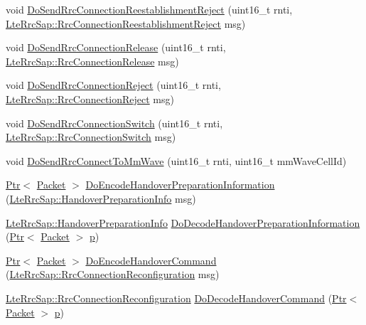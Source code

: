 \begin{DoxyCompactItemize}
\item 
void \hyperlink{classns3_1_1LteEnbRrcProtocolIdeal_a938ccacb99a7b8c9e759bc49d7c8ad7c}{Do\+Send\+Rrc\+Connection\+Reestablishment\+Reject} (uint16\+\_\+t rnti, \hyperlink{structns3_1_1LteRrcSap_1_1RrcConnectionReestablishmentReject}{Lte\+Rrc\+Sap\+::\+Rrc\+Connection\+Reestablishment\+Reject} msg)
\item 
void \hyperlink{classns3_1_1LteEnbRrcProtocolIdeal_a6374f867e8bf3e3620a01cfcbecd58fe}{Do\+Send\+Rrc\+Connection\+Release} (uint16\+\_\+t rnti, \hyperlink{structns3_1_1LteRrcSap_1_1RrcConnectionRelease}{Lte\+Rrc\+Sap\+::\+Rrc\+Connection\+Release} msg)
\item 
void \hyperlink{classns3_1_1LteEnbRrcProtocolIdeal_a47cd505683eb02e7f2877872f2e560f1}{Do\+Send\+Rrc\+Connection\+Reject} (uint16\+\_\+t rnti, \hyperlink{structns3_1_1LteRrcSap_1_1RrcConnectionReject}{Lte\+Rrc\+Sap\+::\+Rrc\+Connection\+Reject} msg)
\item 
void \hyperlink{classns3_1_1LteEnbRrcProtocolIdeal_a17b628a4d804f9df11f066474d954820}{Do\+Send\+Rrc\+Connection\+Switch} (uint16\+\_\+t rnti, \hyperlink{structns3_1_1LteRrcSap_1_1RrcConnectionSwitch}{Lte\+Rrc\+Sap\+::\+Rrc\+Connection\+Switch} msg)
\item 
void \hyperlink{classns3_1_1LteEnbRrcProtocolIdeal_aac7ee3f1897024db77019d51b379b2c3}{Do\+Send\+Rrc\+Connect\+To\+Mm\+Wave} (uint16\+\_\+t rnti, uint16\+\_\+t mm\+Wave\+Cell\+Id)
\item 
\hyperlink{classns3_1_1Ptr}{Ptr}$<$ \hyperlink{classns3_1_1Packet}{Packet} $>$ \hyperlink{classns3_1_1LteEnbRrcProtocolIdeal_a9c87a6df78ca2e278e703b60a8baf0a9}{Do\+Encode\+Handover\+Preparation\+Information} (\hyperlink{structns3_1_1LteRrcSap_1_1HandoverPreparationInfo}{Lte\+Rrc\+Sap\+::\+Handover\+Preparation\+Info} msg)
\item 
\hyperlink{structns3_1_1LteRrcSap_1_1HandoverPreparationInfo}{Lte\+Rrc\+Sap\+::\+Handover\+Preparation\+Info} \hyperlink{classns3_1_1LteEnbRrcProtocolIdeal_a168fd95019bcd64f559a4f7c136fc20b}{Do\+Decode\+Handover\+Preparation\+Information} (\hyperlink{classns3_1_1Ptr}{Ptr}$<$ \hyperlink{classns3_1_1Packet}{Packet} $>$ \hyperlink{lte__link__budget__x2__handover__measures_8m_ac9de518908a968428863f829398a4e62}{p})
\item 
\hyperlink{classns3_1_1Ptr}{Ptr}$<$ \hyperlink{classns3_1_1Packet}{Packet} $>$ \hyperlink{classns3_1_1LteEnbRrcProtocolIdeal_aeb517ca9c04eeb7c2a7aecf22e49557f}{Do\+Encode\+Handover\+Command} (\hyperlink{structns3_1_1LteRrcSap_1_1RrcConnectionReconfiguration}{Lte\+Rrc\+Sap\+::\+Rrc\+Connection\+Reconfiguration} msg)
\item 
\hyperlink{structns3_1_1LteRrcSap_1_1RrcConnectionReconfiguration}{Lte\+Rrc\+Sap\+::\+Rrc\+Connection\+Reconfiguration} \hyperlink{classns3_1_1LteEnbRrcProtocolIdeal_a60eb342c931dcc24027159fecb81463b}{Do\+Decode\+Handover\+Command} (\hyperlink{classns3_1_1Ptr}{Ptr}$<$ \hyperlink{classns3_1_1Packet}{Packet} $>$ \hyperlink{lte__link__budget__x2__handover__measures_8m_ac9de518908a968428863f829398a4e62}{p})
\end{DoxyCompactItemize}
